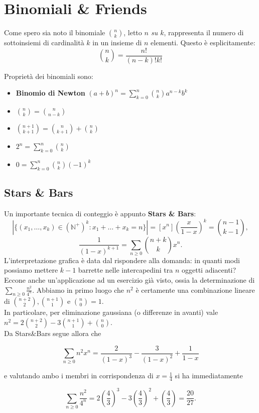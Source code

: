 \documentclass[a4paper,twoside]{article}
\newcommand{\N}{\mathbb{N}}
\theoremstyle{definition}
\numberwithin{theorem}{section}
\begin{document}
\section{Binomiali \& Friends}
Come spero sia noto il binomiale $\binom{n}{k}$, letto \emph{$n$ su $k$}, rappresenta il numero di sottoinsiemi di cardinalità $k$ in un insieme di $n$ elementi.
Questo è esplicitamente:\\
$$\binom{n}{k} = \frac{n!}{(n-k)!k!}$$    

Proprietà dei binomiali sono: 
\begin{itemize}
    \item \textbf{Binomio di Newton} $(a+b)^n=\sum_{k=0}^{n}\binom{n}{k}a^{n-k}b^k$
    \item $\binom{n}{k}=\binom{n}{n-k}$
    \item $\binom{n+1}{k+1}=\binom{n}{k+1} + \binom{n}{k}$
    \item $2^n= \sum_{k=0}^{n}\binom{n}{k}$
    \item $0 = \sum_{k=0}^{n}\binom{n}{k}(-1)^k$
\end{itemize}

\subsection{Stars \& Bars}
Un importante tecnica di conteggio è appunto \textbf{Stars \& Bars}:
$$\left|\{(x_1,\ldots,x_k)\in(\N^+)^k: x_1+\ldots+x_k = n\}\right|=[x^n]\left(\frac{x}{1-x}\right)^k = \binom{n-1}{k-1},$$
$$ \frac{1}{(1-x)^{k+1}}=\sum_{n\geq 0}\binom{n+k}{k}x^n. $$
L'interpretazione grafica è data dal rispondere alla domanda: in quanti modi possiamo mettere $k-1$ barrette nelle intercapedini tra $n$ oggetti adiacenti? Eccone anche un'applicazione ad un esercizio già visto, ossia la determinazione di $\sum_{n\geq 0}\frac{n^2}{4^n}$. Abbiamo in primo luogo che $n^2$ è certamente una combinazione lineare di $\binom{n+2}{2},\binom{n+1}{1}$ e $\binom{n}{0}=1$.\\ In particolare, per eliminazione gaussiana (o differenze in avanti) vale $n^2=2\binom{n+2}{2}-3\binom{n+1}{1}+\binom{n}{0}$.\\ Da Stars\&Bars segue allora che 

$$ \sum_{n\geq 0} n^2 x^n = \frac{2}{(1-x)^3}-\frac{3}{(1-x)^2}+\frac{1}{1-x} $$

e valutando ambo i membri in corrispondenza di $x=\frac{1}{4}$ si ha immediatamente 

$$ \sum_{n\geq 0}\frac{n^2}{4^n} = 2\left(\frac{4}{3}\right)^3-3\left(\frac{4}{3}\right)^2+\left(\frac{4}{3}\right)=\frac{20}{27}.$$
\\
\end{document}
